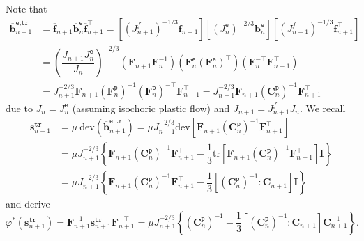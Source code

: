 \documentclass[preprint,11pt]{elsarticle}
\theoremstyle{definition}
\begin{document}
Note that
\begin{equation} \label{be-bar Trial}
    \begin{array}{ll}
        \overline{\mathbf{b}}_{n+1}^\texttt{e,tr}
        &= \overline{\mathbf{f}}_{n+1} \overline{\mathbf{b}}_n^\texttt{e} \overline{\mathbf{f}}_{n+1}^\top
        = \left[ \left( J_{n+1}^f \right)^{-1/3} \mathbf{f}_{n+1} \right]
        \left[ \left( J_{n}^\texttt{e} \right)^{-2/3} \mathbf{b}_n^\texttt{e} \right]
        \left[ \left( J_{n+1}^f \right)^{-1/3} \mathbf{f}_{n+1}^\top \right] \\[10pt]

        &= \left( \dfrac{J_{n+1} J_n^\texttt{e}}{J_n} \right)^{-2/3} \left( \mathbf{F}_{n+1} \mathbf{F}_n^{-1} \right) 
        \left( \mathbf{F}_n^\texttt{e} (\mathbf{F}_n^\texttt{e})^\top \right)
        \left( \mathbf{F}_n^{-\top}  \mathbf{F}_{n+1}^\top \right) \\[10pt]

        & = J_{n+1}^{-2/3} \mathbf{F}_{n+1} \left( \mathbf{F}_n^\texttt{p} \right)^{-1} \left( \mathbf{F}_n^\texttt{p} \right)^{-\top} \mathbf{F}_{n+1}^\top
        = J_{n+1}^{-2/3} \mathbf{F}_{n+1} \left( \mathbf{C}_n^\texttt{p} \right)^{-1} \mathbf{F}_{n+1}^\top
    \end{array}
\end{equation}
due to $J_n = J_n^\texttt{e}$ (assuming isochoric plastic flow) and $J_{n+1} = J_{n+1}^f J_n$. We recall
\begin{equation*}
    \begin{array}{ll}
        \mathbf{s}_{n+1}^\texttt{tr} &= \mu\ \text{dev} \left( \overline{\mathbf{b}}_{n+1}^\texttt{e,tr} \right)
        = \mu J_{n+1}^{-2/3} \text{dev} \left[ \mathbf{F}_{n+1} \left( \mathbf{C}_n^\texttt{p} \right)^{-1} \mathbf{F}_{n+1}^\top \right] \\[10pt]
        &= \mu J_{n+1}^{-2/3} \left\{ \mathbf{F}_{n+1} \left( \mathbf{C}_n^\texttt{p} \right)^{-1} \mathbf{F}_{n+1}^\top
        - \dfrac{1}{3} \text{tr} \left[ \mathbf{F}_{n+1} \left( \mathbf{C}_n^\texttt{p} \right)^{-1} \mathbf{F}_{n+1}^\top \right] \mathbf{I} \right\} \\[10pt]
        &= \mu J_{n+1}^{-2/3} \left\{ \mathbf{F}_{n+1} \left( \mathbf{C}_n^\texttt{p} \right)^{-1} \mathbf{F}_{n+1}^\top
        - \dfrac{1}{3} \left[ \left( \mathbf{C}_n^\texttt{p} \right)^{-1} : \mathbf{C}_{n+1} \right] \mathbf{I} \right\}
    \end{array}
\end{equation*}
and derive
\begin{equation*}
    \varphi^*(\mathbf{s}_{n+1}^\texttt{tr})
    = \mathbf{F}_{n+1}^{-1} \mathbf{s}_{n+1}^\texttt{tr} \mathbf{F}_{n+1}^{-\top}
    = \mu J_{n+1}^{-2/3} \left\{ \left( \mathbf{C}_n^\texttt{p} \right)^{-1}
    - \dfrac{1}{3} \left[ \left( \mathbf{C}_n^\texttt{p} \right)^{-1} : \mathbf{C}_{n+1} \right] \mathbf{C}_{n+1}^{-1} \right\}.
\end{equation*}
\end{document}
